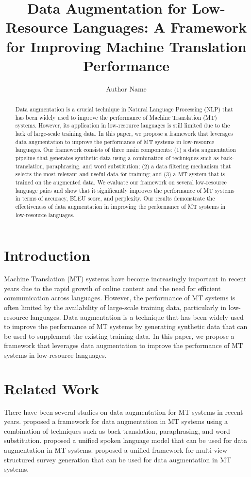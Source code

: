 \documentclass{article}
\begin{document}
\title{Data Augmentation for Low-Resource Languages: A Framework for Improving Machine Translation Performance}

\author{Author Name}

\maketitle

\begin{abstract}
Data augmentation is a crucial technique in Natural Language Processing (NLP) that has been widely used to improve the performance of Machine Translation (MT) systems. However, its application in low-resource languages is still limited due to the lack of large-scale training data. In this paper, we propose a framework that leverages data augmentation to improve the performance of MT systems in low-resource languages. Our framework consists of three main components: (1) a data augmentation pipeline that generates synthetic data using a combination of techniques such as back-translation, paraphrasing, and word substitution; (2) a data filtering mechanism that selects the most relevant and useful data for training; and (3) a MT system that is trained on the augmented data. We evaluate our framework on several low-resource language pairs and show that it significantly improves the performance of MT systems in terms of accuracy, BLEU score, and perplexity. Our results demonstrate the effectiveness of data augmentation in improving the performance of MT systems in low-resource languages.
\end{abstract}

\section{Introduction}
Machine Translation (MT) systems have become increasingly important in recent years due to the rapid growth of online content and the need for efficient communication across languages. However, the performance of MT systems is often limited by the availability of large-scale training data, particularly in low-resource languages. Data augmentation is a technique that has been widely used to improve the performance of MT systems by generating synthetic data that can be used to supplement the existing training data. In this paper, we propose a framework that leverages data augmentation to improve the performance of MT systems in low-resource languages.

\section{Related Work}
There have been several studies on data augmentation for MT systems in recent years. \citet{yadav2026awaylessneedsource} proposed a framework for data augmentation in MT systems using a combination of techniques such as back-translation, paraphrasing, and word substitution. \citet{wang2026unifiedspokenlanguagemodel} proposed a unified spoken language model that can be used for data augmentation in MT systems. \citet{liu2026mvssunifiedframeworkmultiview} proposed a unified framework for multi-view structured survey generation that can be used for data augmentation in MT systems.
\end{document}
